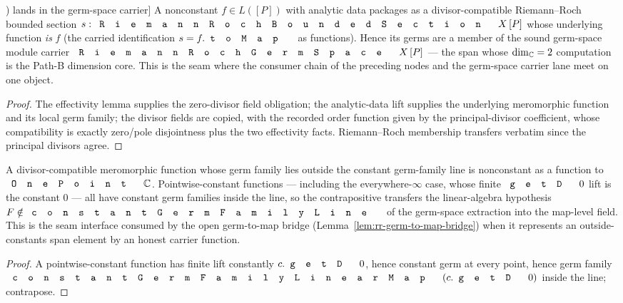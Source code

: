 \begin{lemma}[A nonconstant element of \(L([P])\) lands in the germ-space carrier]
\label{lem:rr-nonconstant-L-point-germ-space-member}
A nonconstant \(f\in L([P])\) with analytic data packages as a
divisor-compatible Riemann--Roch bounded section
\(s : \code{RiemannRochBoundedSection}\,X\,[P]\) whose underlying function
\emph{is} \(f\) (the carried identification \(s = f.\code{toMap}\) as
functions). Hence its germs are a member of the sound germ-space module
carrier \(\code{RiemannRochGermSpace}\,X\,[P]\) — the span whose
\(\dim_{\mathbb{C}} = 2\) computation is the Path-B dimension core. This is the seam
where the consumer chain of the preceding nodes and the germ-space carrier
lane meet on one object.
\leanok
\end{lemma}
\begin{proof}\leanok
The effectivity lemma supplies the zero-divisor field obligation; the
analytic-data lift supplies the underlying meromorphic function and its local
germ family; the divisor fields are copied, with the recorded order function
given by the principal-divisor coefficient, whose compatibility is exactly
zero/pole disjointness plus the two effectivity facts. Riemann--Roch
membership transfers verbatim since the principal divisors agree.
\end{proof}

\begin{lemma}
\label{lem:rr-germs-outside-constants-nonconstant}
A divisor-compatible meromorphic function whose germ family lies outside the
constant germ-family line is nonconstant as a function to
\(\code{OnePoint}\,\C\). Pointwise-constant functions — including the
everywhere-\(\infty\) case, whose finite \(\code{getD}\,0\) lift is the
constant \(0\) — all have constant germ families inside the line, so the
contrapositive transfers the linear-algebra hypothesis
\(F\notin\code{constantGermFamilyLine}\) of the germ-space extraction into
the map-level  field. This is the seam interface consumed
by the open germ-to-map bridge
(Lemma~\ref{lem:rr-germ-to-map-bridge}) when it represents an
outside-constants span element by an honest carrier function.
\leanok
\end{lemma}
\begin{proof}\leanok
A pointwise-constant function has finite lift constantly \(c.\code{getD}\,0\),
hence constant germ at every point, hence germ family
\(\code{constantGermFamilyLinearMap}\,(c.\code{getD}\,0)\) inside the line;
contrapose.
\end{proof}

